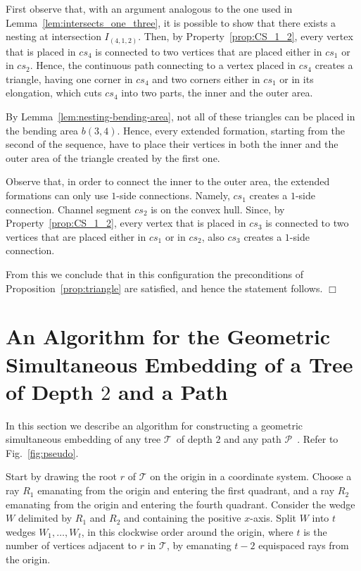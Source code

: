 \documentclass[a4paper,10pt]{llncs}
\newcounter{prop}
\renewenvironment{proof}
{{\bf Proof:}}{\hspace*{\fill}$\Box$\par\vspace{2mm}}
\newcommand{\T}{\mbox{$\mathcal T$ }}
\renewcommand{\P}{\mbox{$\mathcal P$ }}
\begin{document}
\begin{proof}
First observe that, with an argument analogous to the one used in Lemma~\ref{lem:intersects_one_three}, it is possible to show that there exists a nesting at intersection $I_(4,{1,2})$. Then, by Property~\ref{prop:CS_1_2}, every vertex that is placed in $cs_4$ is connected to two vertices that are placed either in $cs_1$ or in $cs_2$. Hence, the continuous path connecting to a vertex placed in $cs_4$ creates a triangle, having one corner in $cs_4$ and two corners either in $cs_1$ or in its elongation, which cuts $cs_4$ into two parts, the inner and the outer area.

By Lemma~\ref{lem:nesting-bending-area}, not all of these triangles can be placed in the bending area $b(3,4)$. Hence, every extended formation, starting from the second of the sequence, have to place their vertices in both the inner and the outer area of the triangle created by the first one.

Observe that, in order to connect the inner to the outer area, the extended formations can only use $1$-side connections. Namely, $cs_1$ creates a $1$-side connection. Channel segment $cs_2$ is on the convex hull. Since, by Property~\ref{prop:CS_1_2}, every vertex that is placed in $cs_3$ is connected to two vertices that are placed either in $cs_1$ or in $cs_2$, also $cs_3$ creates a $1$-side connection.

From this we conclude that in this configuration the preconditions of Proposition~\ref{prop:triangle} are satisfied, and hence the statement follows.
\end{proof}

\section{An Algorithm for the Geometric Simultaneous Embedding of a Tree of Depth $2$ and a Path}\label{se:depth2}

In this section we describe an algorithm for constructing a geometric simultaneous embedding of any tree \T of depth $2$ and any path \P. Refer to Fig.~\ref{fig:pseudo}.

Start by drawing the root $r$ of $\mathcal T$ on the origin in a coordinate system. Choose a ray $R_1$ emanating from the origin and entering the first quadrant, and a ray $R_2$ emanating from the origin and entering the fourth quadrant.
Consider the wedge $W$ delimited by $R_1$ and $R_2$ and containing the positive $x$-axis. Split $W$ into $t$ wedges $W_1, \ldots ,W_t$, in this clockwise order around the origin, where $t$ is the number of vertices adjacent to $r$ in $\mathcal T$, by emanating $t-2$ equispaced rays from the origin.
\end{document}
